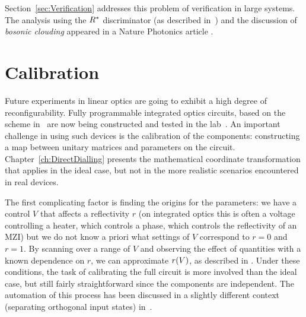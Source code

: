 Section~\ref{sec:Verification} addresses this problem of verification in large
systems. The analysis using the \(R^{*}\) discriminator (as described
in~\cite{notuniform}) and the discussion of \emph{bosonic clouding} appeared in
a Nature Photonics article \cite{verification}.

\section{Calibration}
\label{sec:Calibration}
Future experiments in linear optics are going to exhibit a high degree of
reconfigurability. Fully programmable integrated optics circuits, based on the
scheme in~\cite{reck} are now being constructed and tested in the
lab~\cite{bigreck, qpp}. An important challenge in using such devices is the
calibration of the components: constructing a map between unitary matrices and
parameters on the circuit. Chapter~\ref{ch:DirectDialling} presents the
mathematical coordinate transformation that applies in the ideal case, but not
in the more realistic scenarios encountered in real devices.

The first complicating factor is finding the origins for the parameters: we have
a control \(V\) that affects a reflectivity \(r\) (on integrated optics this is
often a voltage controlling a heater, which controls a phase, which controls the
reflectivity of an MZI) but we do not know a priori what settings of \(V\)
correspond to \(r=0\) and \(r=1\). By scanning over a range of \(V\) and
observing the effect of quantities with a known dependence on \(r\), we can
approximate \(r \!\left(V\right)\), as described in \cite{peteschip}. Under these
conditions, the task of calibrating the full circuit is more involved than the
ideal case, but still fairly straightforward since the components are
independent. The automation of this process has been discussed in a slightly
different context (separating orthogonal input states) in~\cite{alignment}.

